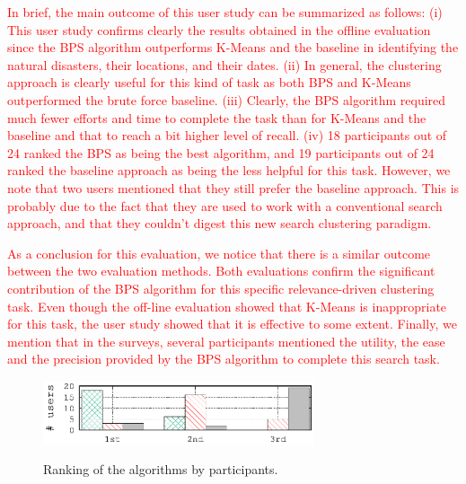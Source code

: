 \textcolor{red}{In brief, the main outcome of this user study can be summarized as follows: 
(i) This user study confirms clearly the results obtained in the offline evaluation since the BPS algorithm outperforms K-Means and the baseline in identifying the natural disasters, their locations, and their dates.
(ii) In general, the clustering approach is clearly useful for this kind of task as both BPS and K-Means outperformed the  brute force baseline. 
(iii) Clearly, the BPS algorithm required much fewer efforts and time to complete the task than for K-Means and the baseline and that to reach a bit higher level of recall. 
(iv) 18 participants out of 24 ranked the BPS as being the best algorithm, and 19 participants out of 24 ranked the baseline approach as being the less helpful for this task.
However, we note that two users mentioned that they still prefer the baseline approach. This is probably due to the fact that they are used to work with a conventional search approach, and that they couldn't digest this new search clustering paradigm. }

\textcolor{red}{ As a conclusion for this evaluation, we notice that there is a similar outcome between the two evaluation methods. Both evaluations confirm the significant contribution of the BPS algorithm for this specific relevance-driven clustering task. Even though the off-line evaluation showed that K-Means is inappropriate for this task, the user study showed that it is effective to some extent. Finally, we mention that in the surveys, several participants mentioned the utility, the ease and the precision provided by the BPS algorithm to complete this search task.}

\begin{figure}[t]
\begin{centering}
{\includegraphics[width=8cm]{imgs/ranking}}
\par\end{centering}
\caption{Ranking of the algorithms by participants.}
\label{fig:UserSurveyRanking}
\end{figure}

